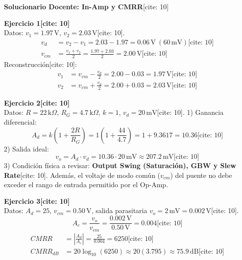 \documentclass[11pt, a4paper]{article}
\begin{document}
\begin{center}
    \Large\textbf{\textcolor{ucbblue}{Solucionario Docente: In-Amp y CMRR}}[cite: 10]
\end{center}

\textbf{Ejercicio 1[cite: 10]} \\
Datos: $v_1 = 1.97\,\text{V}$, $v_2 = 2.03\,\text{V}$[cite: 10].
\begin{align*}
    v_d &= v_2 - v_1 = 2.03 - 1.97 = \boxed{0.06\,\text{V} \ (60\,\text{mV})} \text{[cite: 10]} \\
    v_{cm} &= \frac{v_1 + v_2}{2} = \frac{1.97 + 2.03}{2} = \boxed{2.00\,\text{V}} \text{[cite: 10]}
\end{align*}
Reconstrucción[cite: 10]:
\begin{align*}
    v_1 &= v_{cm} - \frac{v_d}{2} = 2.00 - 0.03 = 1.97\,\text{V} \text{[cite: 10]} \\
    v_2 &= v_{cm} + \frac{v_d}{2} = 2.00 + 0.03 = 2.03\,\text{V} \text{[cite: 10]}
\end{align*}

\textbf{Ejercicio 2[cite: 10]} \\
Datos: $R = 22\,\text{k}\Omega$, $R_G = 4.7\,\text{k}\Omega$, $k=1$, $v_d = 20\,\text{mV}$[cite: 10].
1) Ganancia diferencial:
\begin{equation*}
    A_d = k \left(1 + \frac{2R}{R_G}\right) = 1 \left(1 + \frac{44}{4.7}\right) = 1 + 9.3617 = \boxed{10.36} \text{[cite: 10]}
\end{equation*}
2) Salida ideal:
\begin{equation*}
    v_o = A_d \cdot v_d = 10.36 \cdot 20\,\text{mV} \approx \boxed{207.2\,\text{mV}} \text{[cite: 10]}
\end{equation*}
3) Condición física a revisar: \textbf{Output Swing (Saturación), GBW y Slew Rate}[cite: 10]. Además, el voltaje de modo común ($v_{cm}$) del puente no debe exceder el rango de entrada permitido por el Op-Amp.

\textbf{Ejercicio 3[cite: 10]} \\
Datos: $A_d = 25$, $v_{cm} = 0.50\,\text{V}$, salida parasitaria $v_o = 2\,\text{mV} = 0.002\,\text{V}$[cite: 10].
\begin{equation*}
    A_c = \frac{v_o}{v_{cm}} = \frac{0.002\,\text{V}}{0.50\,\text{V}} = \boxed{0.004} \text{[cite: 10]}
\end{equation*}
\begin{align*}
    CMRR &= \left|\frac{A_d}{A_c}\right| = \frac{25}{0.004} = \boxed{6250} \text{[cite: 10]} \\
    CMRR_{dB} &= 20 \log_{10}(6250) \approx 20(3.795) \approx \boxed{75.9\,\text{dB}} \text{[cite: 10]}
\end{align*}
\end{document}

